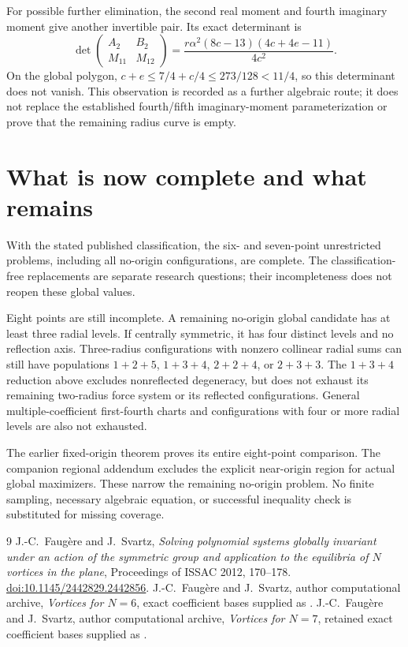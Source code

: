 \documentclass[11pt,a4paper]{article}
\theoremstyle{remark}
\begin{document}
For possible further elimination, the second real moment and fourth
imaginary moment give another invertible pair. Its exact determinant is
\[
 \det\begin{pmatrix}A_2&B_2\\M_{11}&M_{12}\end{pmatrix}
       =\frac{r\alpha^2(8c-13)(4c+4e-11)}{4c^2}.
\]
On the global polygon,
$c+e\le7/4+c/4\le273/128<11/4$, so this determinant does not
vanish. This observation is recorded as a further algebraic route;
it does not replace the established fourth/fifth imaginary-moment
parameterization or prove that the remaining radius curve is empty.

\section{What is now complete and what remains}
With the stated published classification, the six- and seven-point
unrestricted problems, including all no-origin configurations, are
complete. The classification-free replacements are separate research
questions; their incompleteness does not reopen these global values.

Eight points are still incomplete. A remaining no-origin global
candidate has at least three radial levels. If centrally symmetric,
it has four distinct levels and no reflection axis. Three-radius
configurations with nonzero collinear radial sums can still have
populations \(1+2+5\), \(1+3+4\), \(2+2+4\), or \(2+3+3\).
The \(1+3+4\) reduction above excludes nonreflected degeneracy, but
does not exhaust its remaining two-radius force system or its
reflected configurations.
General multiple-coefficient first-fourth charts and configurations
with four or more radial levels are also not exhausted.

The earlier fixed-origin theorem proves its entire eight-point
comparison. The companion regional addendum excludes the explicit
near-origin region for actual global maximizers. These narrow the remaining
no-origin problem. No finite sampling, necessary algebraic equation,
or successful inequality check is substituted for missing coverage.

\begin{thebibliography}{9}
J.-C.~Faug\`ere and J.~Svartz,
\emph{Solving polynomial systems globally invariant under an action of
the symmetric group and application to the equilibria of \(N\) vortices
in the plane}, Proceedings of ISSAC 2012, 170--178.
\href{https://doi.org/10.1145/2442829.2442856}{doi:10.1145/2442829.2442856}.
J.-C.~Faug\`ere and J.~Svartz, author computational archive,
\emph{Vortices for \(N=6\)}, exact coefficient bases supplied as
.
J.-C.~Faug\`ere and J.~Svartz, author computational archive,
\emph{Vortices for \(N=7\)}, retained exact coefficient bases supplied as
.
\end{thebibliography}
\end{document}
